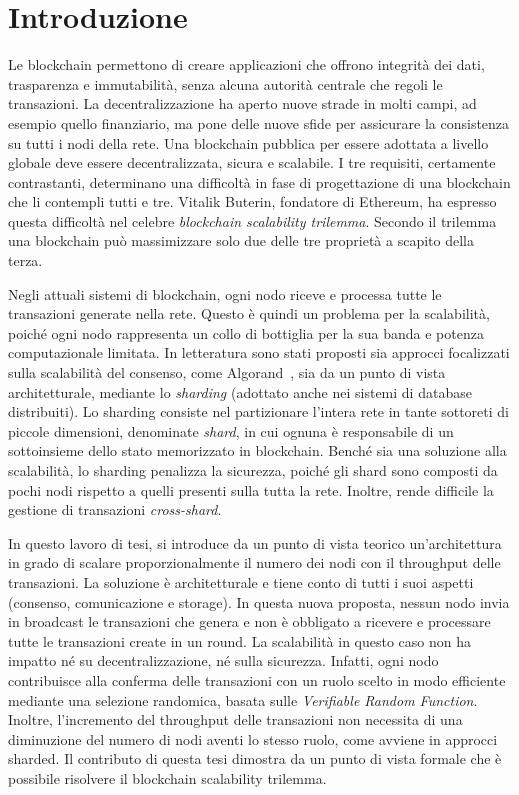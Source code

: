 \chapter{Introduzione}

Le blockchain permettono di creare applicazioni che offrono integrità dei dati, trasparenza e immutabilità, senza alcuna autorità centrale che regoli le transazioni. La decentralizzazione ha aperto nuove strade in molti campi, ad esempio quello finanziario, ma pone delle nuove sfide per assicurare la consistenza su tutti i nodi della rete. Una blockchain pubblica per essere adottata a livello globale deve essere decentralizzata, sicura e scalabile. I tre requisiti, certamente contrastanti, determinano una difficoltà in fase di progettazione di una blockchain che li contempli tutti e tre. Vitalik Buterin, fondatore di Ethereum, ha espresso questa difficoltà nel celebre \textit{blockchain scalability trilemma}. Secondo il trilemma una blockchain può massimizzare solo due delle tre proprietà a scapito della terza.

Negli attuali sistemi di blockchain, ogni nodo riceve e processa tutte le transazioni generate nella rete. Questo è quindi un problema per la scalabilità, poiché ogni nodo rappresenta un collo di bottiglia per la sua banda e potenza computazionale limitata. In letteratura sono stati proposti sia approcci focalizzati sulla scalabilità del consenso, come Algorand~\cite{gilad2017algorand}, sia da un punto di vista architetturale, mediante lo \textit{sharding} (adottato anche nei sistemi di database distribuiti). Lo sharding consiste nel partizionare l'intera rete in tante sottoreti di piccole dimensioni, denominate \textit{shard}, in cui ognuna è responsabile di un sottoinsieme dello stato memorizzato in blockchain. Benché sia una soluzione alla scalabilità, lo sharding penalizza la sicurezza, poiché gli shard sono composti da pochi nodi rispetto a quelli presenti sulla tutta la rete. Inoltre, rende difficile la gestione di transazioni \textit{cross-shard}.

In questo lavoro di tesi, si introduce da un punto di vista teorico un'architettura in grado di scalare proporzionalmente il numero dei nodi con il throughput delle transazioni. La soluzione è architetturale e tiene conto di tutti i suoi aspetti (consenso, comunicazione e storage). In questa nuova proposta, nessun nodo invia in broadcast le transazioni che genera e non è obbligato a ricevere e processare tutte le transazioni create in un round. La scalabilità in questo caso non ha impatto né su decentralizzazione, né sulla sicurezza. Infatti, ogni nodo contribuisce alla conferma delle transazioni con un ruolo scelto in modo efficiente mediante una selezione randomica, basata sulle \textit{Verifiable Random Function}. Inoltre, l'incremento del throughput delle transazioni non necessita di una diminuzione del numero di nodi aventi lo stesso ruolo, come avviene in approcci sharded. Il contributo di questa tesi dimostra da un punto di vista formale che è possibile risolvere il blockchain scalability trilemma.
